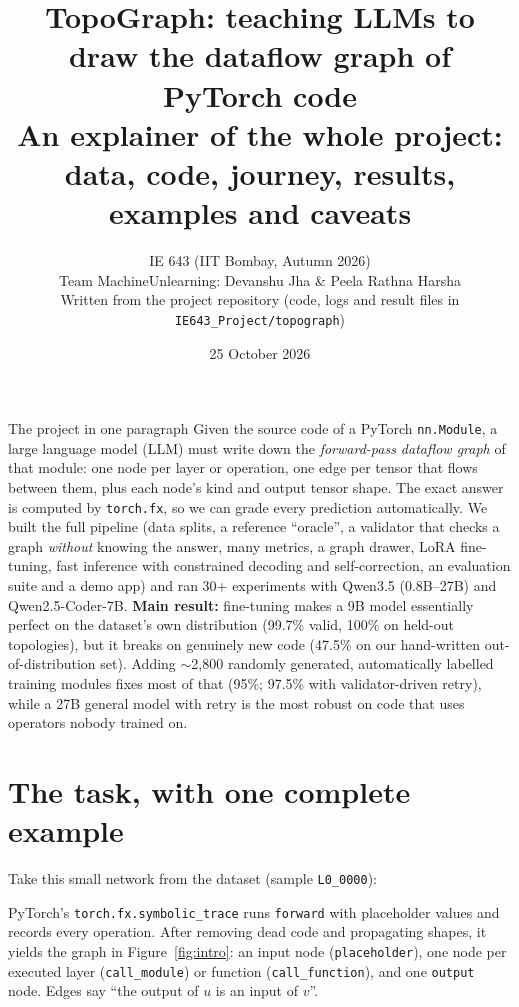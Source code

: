 \documentclass[11pt,a4paper]{article}
\title{\textbf{TopoGraph: teaching LLMs to draw the dataflow graph of PyTorch code}\\[4pt]
\large An explainer of the whole project: data, code, journey, results, examples and caveats}
\author{IE 643 (IIT Bombay, Autumn 2026)\\Team MachineUnlearning: Devanshu Jha \& Peela Rathna Harsha\\
\small Written from the project repository (code, logs and result files in \texttt{IE643\_Project/topograph})}
\date{25 October 2026}
\begin{document}
\maketitle

\begin{keybox}{The project in one paragraph}
Given the source code of a PyTorch \texttt{nn.Module}, a large language model (LLM) must write down the
\emph{forward-pass dataflow graph} of that module: one node per layer or operation, one edge per tensor that flows
between them, plus each node's kind and output tensor shape. The exact answer is computed by \texttt{torch.fx}, so we
can grade every prediction automatically. We built the full pipeline (data splits, a reference ``oracle'', a validator
that checks a graph \emph{without} knowing the answer, many metrics, a graph drawer, LoRA fine-tuning, fast inference
with constrained decoding and self-correction, an evaluation suite and a demo app) and ran 30+ experiments with
Qwen3.5 (0.8B--27B) and Qwen2.5-Coder-7B. \textbf{Main result:} fine-tuning makes a 9B model essentially perfect on
the dataset's own distribution (99.7\% valid, 100\% on held-out topologies), but it breaks on genuinely new code
(47.5\% on our hand-written out-of-distribution set). Adding $\sim$2{,}800 randomly generated, automatically labelled
training modules fixes most of that (95\%; 97.5\% with validator-driven retry), while a 27B general model with retry is
the most robust on code that uses operators nobody trained on.
\end{keybox}

\tableofcontents
\clearpage

\section{The task, with one complete example}\label{sec:task}

Take this small network from the dataset (sample \texttt{L0\_0000}):



PyTorch's \texttt{torch.fx.symbolic\_trace} runs \texttt{forward} with placeholder values and records every operation.
After removing dead code and propagating shapes, it yields the graph in Figure~\ref{fig:intro}: an input node
(\texttt{placeholder}), one node per executed layer (\texttt{call\_module}) or function (\texttt{call\_function}), and one
\texttt{output} node. Edges say ``the output of $u$ is an input of $v$''.
\end{document}

